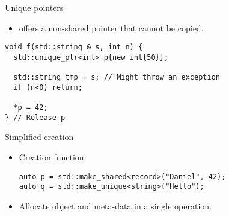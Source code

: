 \begin{frame}[t,fragile]{Unique pointers}
\begin{itemize}
  \item {} offers a non-shared pointer that cannot be copied.
\end{itemize}

\begin{lstlisting}
void f(std::string & s, int n) {
  std::unique_ptr<int> p{new int{50}};

  std::string tmp = s; // Might throw an exception
  if (n<0) return;

  *p = 42;
} // Release p
\end{lstlisting}
\end{frame}

\begin{frame}[t,fragile]{Simplified creation}
\begin{itemize}
  \item Creation function:
\begin{lstlisting}
auto p = std::make_shared<record>("Daniel", 42);
auto q = std::make_unique<string>("Hello");
\end{lstlisting}
  \item Allocate object and meta-data in a single operation.
\end{itemize}
\end{frame}

